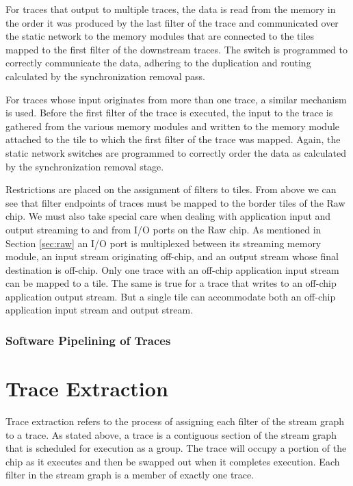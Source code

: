 For traces that output to multiple traces, the data is read from the
memory in the order it was produced by the last filter of the trace
and communicated over the static network to the memory modules that
are connected to the tiles mapped to the first filter of the
downstream traces. The switch is programmed to correctly communicate
the data, adhering to the duplication and routing calculated by the
synchronization removal pass.

For traces whose input originates from more than one trace, a similar
mechanism is used.  Before the first filter of the trace is executed,
the input to the trace is gathered from the various memory modules
and written to the memory module attached to the tile to which the
first filter of the trace was mapped.  Again, the static network
switches are programmed to correctly order the data as calculated by
the synchronization removal stage.   

Restrictions are placed on the assignment of filters to tiles. From
above we can see that filter endpoints of traces must be mapped to the
border tiles of the Raw chip. We must also take special care when
dealing with application input and output streaming to and from I/O
ports on the Raw chip.  As mentioned in Section \ref{sec:raw} an I/O
port is multiplexed between its streaming memory module, an input
stream originating off-chip, and an output stream whose final
destination is off-chip.  Only one trace with an off-chip application
input stream can be mapped to a tile.  The same is true for a trace
that writes to an off-chip application output stream.  But a single
tile can accommodate both an off-chip application input stream and
output stream.

\subsubsection{Software Pipelining of Traces}

\section{Trace Extraction}
Trace extraction refers to the process of assigning each filter of the
stream graph to a trace.  As stated above, a trace is a contiguous
section of the stream graph that is scheduled for execution as a
group. The trace will occupy a portion of the chip as it executes and
then be swapped out when it completes execution.  Each filter in the
stream graph is a member of exactly one trace.

